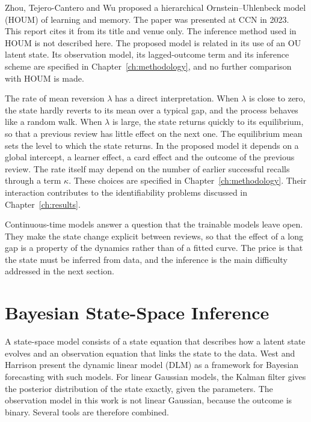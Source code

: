 Zhou, Tejero-Cantero and Wu \cite{zhou2023houm} proposed a hierarchical Ornstein--Uhlenbeck model (HOUM)
of learning and memory. The paper was presented at CCN in 2023. This report cites it from its title and venue only. The inference method used in HOUM is not
described here. The proposed model is related in its use of an OU latent state. Its observation model,
its lagged-outcome term and its inference scheme are specified in Chapter~\ref{ch:methodology}, and no
further comparison with HOUM is made.

The rate of mean reversion $\lambda$ has a direct interpretation. When $\lambda$ is close to zero, the state
hardly reverts to its mean over a typical gap, and the process behaves like a random walk. When $\lambda$ is
large, the state returns quickly to its equilibrium, so that a previous review has little effect on the next
one. The equilibrium mean sets the level to which the state returns. In the proposed model it depends on a
global intercept, a learner effect, a card effect and the outcome of the previous review. The rate itself may
depend on the number of earlier successful recalls through a term $\kappa$. These choices are specified in
Chapter~\ref{ch:methodology}. Their interaction contributes to the identifiability problems discussed in
Chapter~\ref{ch:results}.

Continuous-time models answer a question that the trainable models leave open. They make the state
change explicit between reviews, so that the effect of a long gap is a property of the dynamics rather
than of a fitted curve. The price is that the state must be inferred from data, and the inference is the
main difficulty addressed in the next section.

\section{Bayesian State-Space Inference}
\label{sec:lit-bayesian}

A state-space model consists of a state equation that describes how a latent state evolves and an
observation equation that links the state to the data. West and Harrison \cite{west1997bayesian} present
the dynamic linear model (DLM) as a framework for Bayesian forecasting with such models. For linear
Gaussian models, the Kalman filter gives the posterior distribution of the state exactly, given the
parameters. The observation model in this work is not linear Gaussian, because the outcome is binary.
Several tools are therefore combined.


